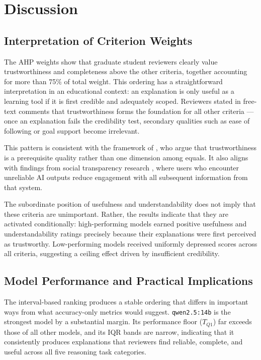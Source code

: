 \chapter{Discussion}
\label{ch:discussion}

\section{Interpretation of Criterion Weights}
\label{sec:disc-weights}

The AHP weights show that graduate student reviewers clearly value trustworthiness
and completeness above the other criteria, together accounting for more than 75\% of
total weight. This ordering has a straightforward interpretation in an educational
context: an explanation is only useful as a learning tool if it is first credible and
adequately scoped. Reviewers stated in free-text comments that trustworthiness forms
the foundation for all other criteria — once an explanation fails the credibility
test, secondary qualities such as ease of following or goal support become irrelevant.

This pattern is consistent with the framework of \citet{hoffman2019metrics}, who
argue that trustworthiness is a prerequisite quality rather than one dimension among
equals. It also aligns with findings from social transparency research
\citep{ehsan2021expanding}, where users who encounter unreliable AI outputs reduce
engagement with all subsequent information from that system.

The subordinate position of usefulness and understandability does not imply that
these criteria are unimportant. Rather, the results indicate that they are activated
conditionally: high-performing models earned positive usefulness and understandability
ratings precisely because their explanations were first perceived as trustworthy.
Low-performing models received uniformly depressed scores across all criteria,
suggesting a ceiling effect driven by insufficient credibility.

\section{Model Performance and Practical Implications}
\label{sec:disc-models}

The interval-based ranking produces a stable ordering that differs in important ways
from what accuracy-only metrics would suggest. \texttt{qwen2.5:14b} is the strongest
model by a substantial margin. Its performance floor ($T_{Q1}$) far exceeds those of
all other models, and its IQR bands are narrow, indicating that it consistently
produces explanations that reviewers find reliable, complete, and useful across all
five reasoning task categories.

